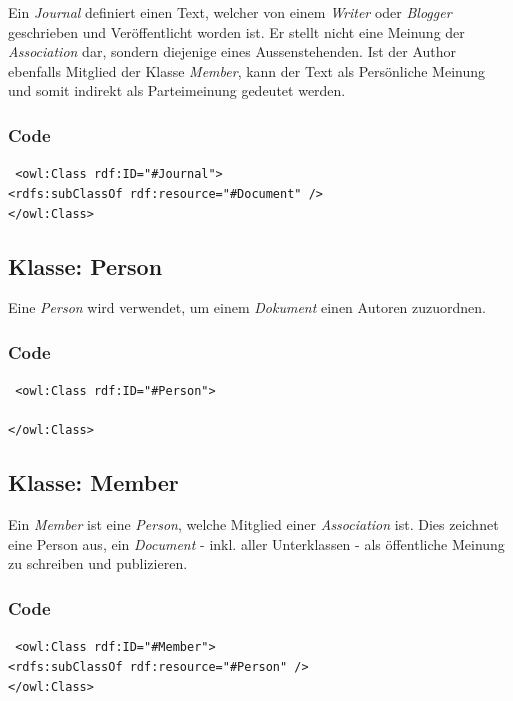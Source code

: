 ﻿\documentclass[
    11pt,
    latin1,
    a4paper,
    oneside
]{scrreprt}
\begin{document}
Ein \emph{Journal} definiert einen Text, welcher von einem \emph{Writer} oder \emph{Blogger} geschrieben und Veröffentlicht worden ist. Er stellt nicht eine Meinung der \emph{Association} dar, sondern diejenige eines Aussenstehenden. Ist der Author ebenfalls Mitglied der Klasse \emph{Member}, kann der Text als Pers\"onliche Meinung und somit indirekt als Parteimeinung gedeutet werden.

\subsubsection{Code} \label{sec:class_journal_code}

\texttt{ <owl:Class rdf:ID="#Journal"> \\
    <rdfs:subClassOf rdf:resource="#Document" /> \\
</owl:Class> }


\subsection{Klasse: Person} \label{sec:class_person}

Eine \emph{Person} wird verwendet, um einem \emph{Dokument} einen Autoren zuzuordnen.

\subsubsection{Code} \label{sec:class_person_code}

\texttt{ <owl:Class rdf:ID="#Person"> \\
     \\
</owl:Class> }


\subsection{Klasse: Member} \label{sec:class_member}

Ein \emph{Member} ist eine \emph{Person}, welche Mitglied einer \emph{Association} ist. Dies zeichnet eine Person aus, ein \emph{Document} - inkl. aller Unterklassen - als \"offentliche Meinung zu schreiben und publizieren.

\subsubsection{Code} \label{sec:class_member_code}

\texttt{ <owl:Class rdf:ID="#Member"> \\
    <rdfs:subClassOf rdf:resource="#Person" /> \\
</owl:Class> }
\end{document}
